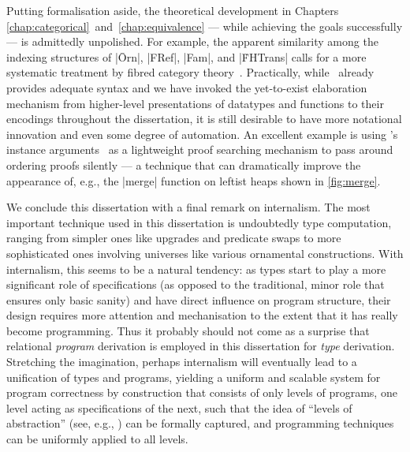 Putting formalisation aside, the theoretical development in Chapters \ref{chap:categorical}~and~\ref{chap:equivalence} --- while achieving the goals successfully --- is admittedly unpolished.
For example, the apparent similarity among the indexing structures of |Ōrn|, |FRef|, |Fam|, and |ḞHTrans| calls for a more systematic treatment by fibred category theory~\citep{Jacobs-categorical-logic-and-type-theory}.
Practically, while \Agda\ already provides adequate syntax and we have invoked the yet-to-exist elaboration mechanism from higher-level presentations of datatypes and functions to their encodings throughout the dissertation, it is still desirable to have more notational innovation and even some degree of automation.
An excellent example is  using \Agda's instance arguments~\citep{Devriese-instance-arguments} as a lightweight proof searching mechanism to pass around ordering proofs silently --- a technique that can dramatically improve the appearance of, e.g., the |merge| function on leftist heaps shown in \autoref{fig:merge}.

We conclude this dissertation with a final remark on internalism.
The most important technique used in this dissertation is undoubtedly type computation, ranging from simpler ones like upgrades and predicate swaps to more sophisticated ones involving universes like various ornamental constructions.
With internalism, this seems to be a natural tendency: as types start to play a more significant role of specifications (as opposed to the traditional, minor role that ensures only basic sanity) and have direct influence on program structure, their design requires more attention and mechanisation to the extent that it has really become programming.
Thus it probably should not come as a surprise that relational \emph{program} derivation is employed in this dissertation for \emph{type} derivation.
Stretching the imagination, perhaps internalism will eventually lead to a unification of types and programs, yielding a uniform and scalable system for program correctness by construction that consists of only levels of programs, one level acting as specifications of the next, such that the idea of ``levels of abstraction'' (see, e.g., \citet{Dijkstra-notes-on-structured-programming}) can be formally captured, and programming techniques can be uniformly applied to all levels.
